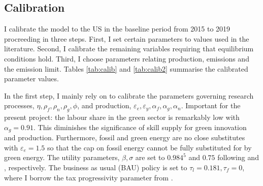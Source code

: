 \subsection{Calibration}\label{subsec:calib}
I calibrate the model to the US in the baseline period from 2015 to 2019 procreeding in three steps. First, I set certain parameters to values used in the literature. Second, I calibrate the remaining variables requiring that equilibrium conditions hold. Third, I choose parameters relating production, emissions and the emission limit. Tables \ref{tab:calib} and \ref{tab:calib2} summarise the calibrated parameter values.

In the first step, I mainly rely on \cite{Fried2018ClimateAnalysis} to calibrate the parameters governing research processes, $\eta, \rho_f,\rho_n, \rho_g, \phi $, and production, $\varepsilon_e, \varepsilon_y, \alpha_f, \alpha_g, \alpha_n$.  Important for the present project: the labour share in the green sector is remarkably low with $\alpha_g=0.91$. This diminishes the significance of skill supply for green innovation and production. Furthermore, fossil and green energy are no close substitutes with $\varepsilon_e=1.5$ so that the cap on fossil energy cannot be fully substituted for by green energy. The utility parameters, $\beta, \sigma$ are set to $0.984^5$ and $0.75$ following \cite{Barrage2019OptimalPolicy} and \cite{Chetty2011AreMargins}, respectively. The business as usual (BAU) policy is set to $\tau_l=0.181, \tau_f=0$, where I borrow the tax progressivity parameter from \cite{Heathcote2017OptimalFramework}. 

